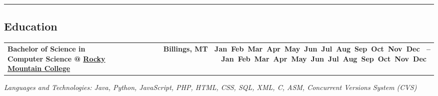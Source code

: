 \documentclass[9pt,letterpaper]{extarticle}
\makeatletter
\newcommand{\headerrow}[2]
{\begin{tabular*}{\linewidth}{l@{\extracolsep{\fill}}r}
	#1 &
	#2 \\
\end{tabular*}}
\newcommand{\DatestampYM}[2]{\mbox{\ShortMonth{#2}#1}}
\newcommand{\ShortMonth}[1]{
\ifcase#1\relax
\or Jan
\or Feb
\or Mar
\or Apr
\or May
\or Jun
\or Jul
\or Aug
\or Sep
\or Oct
\or Nov
\or Dec
\fi}
\makeatother
\begin{document}
\hrule
\vspace{-0.5em}
\subsection*{Education}
\headerrow
	{\textbf{Bachelor of Science in Computer Science @ \href{http://www.rocky.edu/}{Rocky Mountain College}}}
	{\textbf{Billings, MT \DatestampYM{2010}{08} --\DatestampYM{2014}{05}}}
\emph{Languages and Technologies: Java, Python, JavaScript, PHP, HTML, CSS, SQL, XML, C, ASM, Concurrent Versions System (CVS)}
\end{document}
